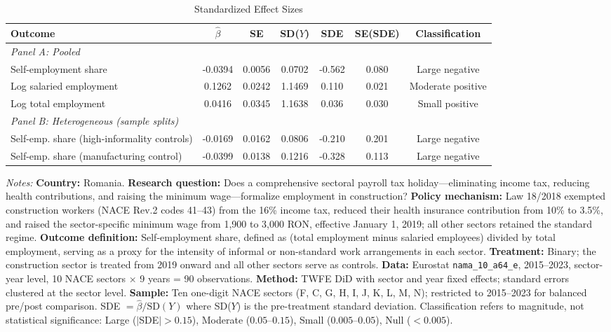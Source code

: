\begin{table}[htbp]
\centering
\caption{Standardized Effect Sizes}
\label{tab:sde}
\begin{adjustbox}{max width=\textwidth}
\begin{threeparttable}
\begin{tabular}{lcccccc}
\toprule
Outcome & $\hat{\beta}$ & SE & SD($Y$) & SDE & SE(SDE) & Classification \\
\midrule
\multicolumn{7}{l}{\textit{Panel A: Pooled}} \\
Self-employment share & -0.0394 & 0.0056 & 0.0702 & -0.562 & 0.080 & Large negative \\
Log salaried employment & 0.1262 & 0.0242 & 1.1469 & 0.110 & 0.021 & Moderate positive \\
Log total employment & 0.0416 & 0.0345 & 1.1638 & 0.036 & 0.030 & Small positive \\
\midrule
\multicolumn{7}{l}{\textit{Panel B: Heterogeneous (sample splits)}} \\
Self-emp. share (high-informality controls) & -0.0169 & 0.0162 & 0.0806 & -0.210 & 0.201 & Large negative \\
Self-emp. share (manufacturing control) & -0.0399 & 0.0138 & 0.1216 & -0.328 & 0.113 & Large negative \\
\bottomrule
\end{tabular}
\begin{tablenotes}[flushleft]
\footnotesize
\item \textit{Notes:} \textbf{Country:} Romania. \textbf{Research question:} Does a comprehensive sectoral payroll tax holiday---eliminating income tax, reducing health contributions, and raising the minimum wage---formalize employment in construction? \textbf{Policy mechanism:} Law 18/2018 exempted construction workers (NACE Rev.2 codes 41--43) from the 16\% income tax, reduced their health insurance contribution from 10\% to 3.5\%, and raised the sector-specific minimum wage from 1,900 to 3,000 RON, effective January 1, 2019; all other sectors retained the standard regime. \textbf{Outcome definition:} Self-employment share, defined as (total employment minus salaried employees) divided by total employment, serving as a proxy for the intensity of informal or non-standard work arrangements in each sector. \textbf{Treatment:} Binary; the construction sector is treated from 2019 onward and all other sectors serve as controls. \textbf{Data:} Eurostat \texttt{nama\_10\_a64\_e}, 2015--2023, sector-year level, 10 NACE sectors $\times$ 9 years = 90 observations. \textbf{Method:} TWFE DiD with sector and year fixed effects; standard errors clustered at the sector level. \textbf{Sample:} Ten one-digit NACE sectors (F, C, G, H, I, J, K, L, M, N); restricted to 2015--2023 for balanced pre/post comparison. SDE $= \hat{\beta} / \text{SD}(Y)$ where SD($Y$) is the pre-treatment standard deviation. Classification refers to magnitude, not statistical significance: Large ($|$SDE$| > 0.15$), Moderate ($0.05$--$0.15$), Small ($0.005$--$0.05$), Null ($< 0.005$).
\end{tablenotes}
\end{threeparttable}
\end{adjustbox}
\end{table}
